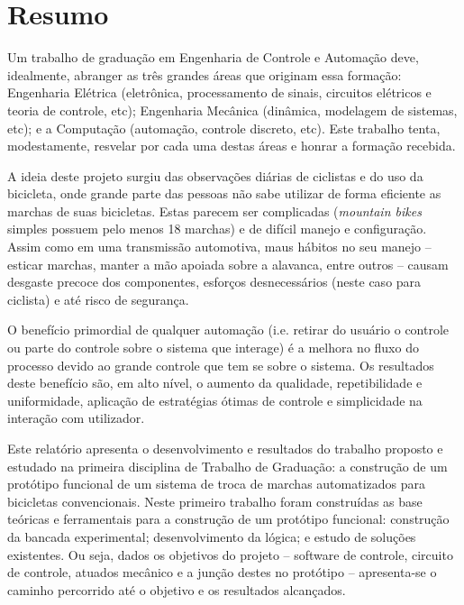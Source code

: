 \documentclass[a4paper,11pt]{article}
\begin{document}



%
\section{Resumo}
\label{sec:resumo}
Um trabalho de graduação em Engenharia de Controle e Automação deve,
idealmente, abranger as três grandes áreas que originam essa
formação\cite{enciclo}: Engenharia Elétrica (eletrônica, processamento de
sinais, circuitos elétricos e teoria de controle, etc); Engenharia
Mecânica (dinâmica, modelagem de sistemas, etc); e a Computação (automação,
controle discreto, etc). Este trabalho tenta, modestamente, resvelar por cada
uma destas áreas e honrar a formação recebida.

A ideia deste projeto surgiu das observações diárias de ciclistas e do
uso da bicicleta, onde grande parte das pessoas não sabe utilizar de
forma eficiente as marchas de suas bicicletas. Estas parecem ser
complicadas (\textit{mountain bikes} simples possuem pelo menos 18 marchas) e de
difícil manejo e configuração. Assim como em uma transmissão automotiva, maus
hábitos no seu manejo -- esticar marchas, manter a mão apoiada sobre a alavanca,
entre outros -- causam desgaste precoce dos componentes, esforços desnecessários
(neste caso para ciclista) e até risco de segurança.

O benefício primordial de qualquer automação (i.e. retirar do usuário o
controle ou parte do controle sobre o sistema que interage) é a melhora no
fluxo do processo devido ao grande controle que tem se sobre o sistema. Os
resultados deste benefício são, em alto nível, o aumento da qualidade,
repetibilidade e uniformidade, aplicação de estratégias ótimas de controle e
simplicidade na interação com utilizador.

Este relatório apresenta o desenvolvimento e resultados do trabalho proposto e
estudado na primeira disciplina de Trabalho de Graduação: a construção de um
protótipo funcional de um sistema de troca de marchas automatizados para
bicicletas convencionais. Neste primeiro trabalho foram construídas as base
teóricas e ferramentais para a construção de um protótipo funcional: construção
da bancada experimental; desenvolvimento da lógica; e estudo de soluções 
existentes. Ou seja, dados os objetivos do projeto -- software de controle,
circuito de controle, atuados mecânico e a junção destes no protótipo --
apresenta-se o caminho percorrido até o objetivo e os resultados alcançados.
\end{document}
